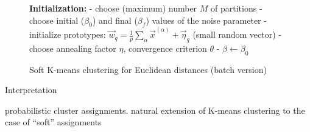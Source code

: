 \begin{frame}[shrink=18]%
\begin{figure}[!th]
\footnotesize
\removelatexerror
\begin{algorithm}[H]
  \DontPrintSemicolon
  \textbf{Initialization:}\;
 - choose (maximum) number $M$ of partitions\; 
- choose initial ($\beta_0$) and final ($\beta_f$) values of the noise parameter\;
- initialize prototypes:  $\vec{w}_q = \frac{1}{p} 
\sum\limits_{\alpha} \vec{x}^{(\alpha)} + \vec{\eta}_q$ (small random vector)\;
- choose annealing factor $\eta$, convergence criterion $\theta$\;
- $\beta \leftarrow \beta_0$\;
\label{alg:softKmeansEuclidean}
\caption{Soft K-means clustering for Euclidean distances (batch version)}
\end{algorithm}
\end{figure}
\begin{block}{Interpretation}
\begin{itemize}
     \itl probabilistic cluster assignments.
	\itl natural extension of K-means clustering to the case of ``soft'' assignments
\end{itemize}
\end{block}
\end{frame}

